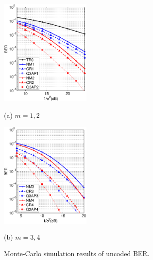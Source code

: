 \documentclass[journal]{IEEEtran}
\begin{document}
\begin{figure}[!t]
  \begin{minipage}[b]{.48\linewidth}
    \centering
    \centerline{\includegraphics[width=4.5cm]{./figs/BER_noise_power_MonteCarlo_64QAM_12.eps}}
    \centerline{(a) $m=1,2$}\medskip
  \end{minipage}
  \hfill
  \begin{minipage}[b]{0.48\linewidth}
    \centering
    \centerline{\includegraphics[width=4.5cm]{./figs/BER_noise_power_MonteCarlo_64QAM_34.eps}}
    \centerline{(b) $m=3,4$}\medskip
  \end{minipage}
  \vspace{-10pt}
  \caption{Monte-Carlo simulation results of uncoded BER.}
  \label{fig:uncoded_noisepower_mc}
\end{figure}
\end{document}
